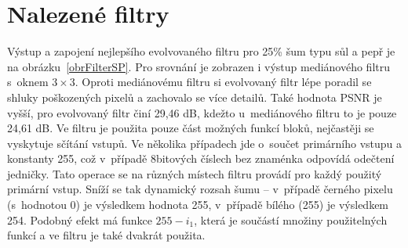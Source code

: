 \section{Nalezené filtry}
\label{secExpFilters}

Výstup a zapojení nejlepšího evolvovaného filtru pro 25\% šum typu sůl a pepř je na obrázku~\ref{obrFilterSP}. Pro srovnání je zobrazen i výstup mediánového filtru s~oknem $3\times3$. Oproti mediánovému filtru si evolvovaný filtr lépe poradil se shluky poškozených pixelů a zachovalo se více detailů. Také hodnota PSNR je vyšší, pro evolvovaný filtr činí 29,46 dB, kdežto u~mediánového filtru to je pouze 24,61 dB. Ve filtru je použita pouze část možných funkcí bloků, nejčastěji se vyskytuje sčítání vstupů. Ve několika případech jde o~součet primárního vstupu a konstanty 255, což v~případě 8bitových číslech bez znaménka odpovídá odečtení jedničky. Tato operace se na různých místech filtru provádí pro každý použitý primární vstup. Sníží se tak dynamický rozsah šumu -- v~případě černého pixelu (s~hodnotou 0) je výsledkem hodnota 255, v~případě bílého (255) je výsledkem 254. Podobný efekt má funkce $255 - i_1$, která je součástí množiny použitelných funkcí a ve filtru je také dvakrát použita.%

